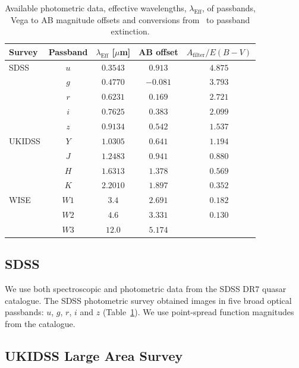 \begin{table}
  \footnotesize
  \centering
  \begin{tabular}{lcccc}
    \hline 
    Survey & Passband & $\lambda_{\text{Eff}}$ [$\mu$m] & AB offset & $A_{\text{filter}}/E(B-V)$ \\
    \hline 
    SDSS & $u$ & $0.3543$ & $ 0.913$ & $4.875$ \\
         & $g$ & $0.4770$ & $-0.081$ & $3.793$ \\
         & $r$ & $0.6231$ & $ 0.169$ & $2.721$ \\
         & $i$ & $0.7625$ & $ 0.383$ & $2.099$ \\
         & $z$ & $0.9134$ & $ 0.542$ & $1.537$ \\
    UKIDSS & $Y$ & $1.0305$ &  $0.641$ & $1.194$ \\
           & $J$ & $1.2483$ &  $0.941$ & $0.880$ \\
           & $H$ & $1.6313$ &  $1.378$ & $0.569$ \\
           & $K$ & $2.2010$ &  $1.897$ & $0.352$ \\
    WISE & $W1$ & $3.4$ & $2.691$ & $0.182$\\
         & $W2$ & $4.6$ & $3.331$ & $0.130$\\
         & $W3$ & $12.0$ & $5.174$ & \\           
    \hline
  \end{tabular}
  \caption[{Available photometric data, effective wavelengths of passbands, Vega to AB magnitude offsets and conversions from \ebv\, to passband extinction.}]{Available photometric data, effective wavelengths, $\lambda_{\text{Eff}}$, of passbands, Vega to AB magnitude offsets and conversions from \ebv\, to passband extinction.}
  \label{tab:photometry}
\end{table}

\subsection{SDSS}

We use both spectroscopic and photometric data from the SDSS DR$7$ quasar catalogue.
The SDSS photometric survey obtained images in five broad optical passbands: $u$, $g$, $r$, $i$ and $z$ (Table~\ref{tab:photometry}).  
We use point-spread function magnitudes from the catalogue.

\subsection{UKIDSS Large Area Survey}

